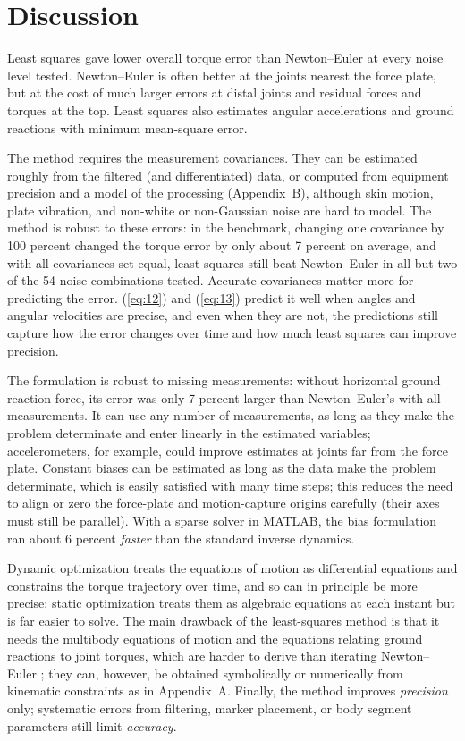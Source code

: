 \documentclass[11pt]{article}
\begin{document}
\section*{Discussion}

Least squares gave lower overall torque error than Newton--Euler at every
noise level tested. Newton--Euler is often better at the joints nearest the
force plate, but at the cost of much larger errors at distal joints and
residual forces and torques at the top. Least squares also estimates angular
accelerations and ground reactions with minimum mean-square error.

The method requires the measurement covariances. They can be estimated
roughly from the filtered (and differentiated) data, or computed from
equipment precision and a model of the processing (Appendix~B), although skin
motion, plate vibration, and non-white or non-Gaussian noise are hard to
model. The method is robust to these errors: in the benchmark, changing one
covariance by 100 percent changed the torque error by only about 7 percent on
average, and with all covariances set equal, least squares still beat
Newton--Euler in all but two of the 54 noise combinations tested. Accurate
covariances matter more for predicting the error. (\ref{eq:12}) and
(\ref{eq:13}) predict it well when angles and angular velocities are precise,
and even when they are not, the predictions still capture how the error
changes over time and how much least squares can improve precision.

The formulation is robust to missing measurements: without horizontal ground
reaction force, its error was only 7 percent larger than Newton--Euler's with
all measurements. It can use any number of measurements, as long as they
make the problem determinate and enter linearly in the estimated variables;
accelerometers, for example, could improve estimates at joints far from the
force plate. Constant biases can be estimated as long as the data make the
problem determinate, which is easily satisfied with many time steps; this
reduces the need to align or zero the force-plate and motion-capture origins
carefully (their axes must still be parallel). With a sparse solver in MATLAB,
the bias formulation ran about 6 percent \emph{faster} than the standard
inverse dynamics.

Dynamic optimization \cite{ChaoRim1973} treats the equations of motion as
differential equations and constrains the torque trajectory over time, and so
can in principle be more precise; static optimization treats them as
algebraic equations at each instant but is far easier to solve. The main
drawback of the least-squares method is that it needs the multibody equations
of motion and the equations relating ground reactions to joint torques, which
are harder to derive than iterating Newton--Euler \cite{Greenwood1988}; they
can, however, be obtained symbolically or numerically from kinematic
constraints as in Appendix~A. Finally, the method improves \emph{precision}
only; systematic errors from filtering, marker placement, or body segment
parameters still limit \emph{accuracy}.
\end{document}
